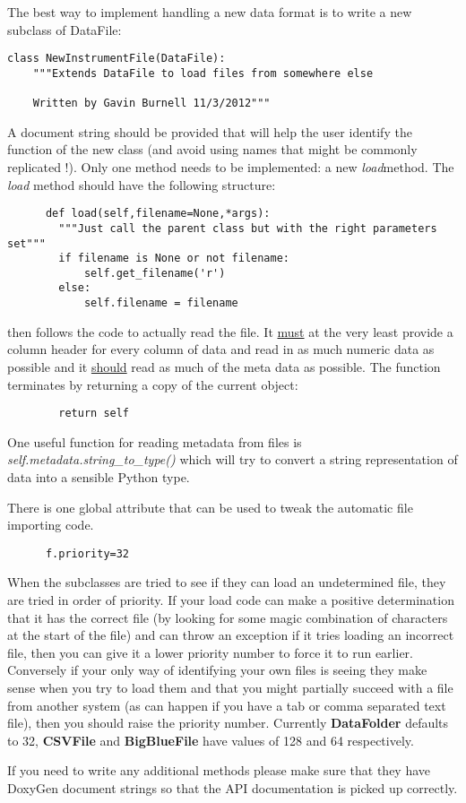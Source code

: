 \documentclass[a4paper,11pt]{scrartcl}
\begin{document}
The best way to implement handling a new data format is to write a new subclass of DataFile:
 \begin{verbatim}
class NewInstrumentFile(DataFile):
    """Extends DataFile to load files from somewhere else

    Written by Gavin Burnell 11/3/2012"""
 \end{verbatim}
 A document string should be provided that will help the user identify the function of the new class (and avoid using names that might be commonly replicated !). Only one method needs to be implemented: a new \textit{load}method. The \textit{load} method should have the following structure:
\begin{verbatim}
      def load(self,filename=None,*args):
        """Just call the parent class but with the right parameters set"""
        if filename is None or not filename:
            self.get_filename('r')
        else:
            self.filename = filename
\end{verbatim}
then follows the code to actually read the file. It \underline{must} at the very least provide a column header for every column of data and read in as much numeric data as possible and it \underline{should} read as much of the meta data as possible. The function terminates by returning a copy of the current object:
\begin{verbatim}
        return self
\end{verbatim}
One useful function for reading metadata from files is \textit{self.metadata.string\_to\_type()} which will try to convert a string representation of data into a sensible Python type.

There is one global attribute that can be used to tweak the automatic file importing code.
\begin{verbatim}
      f.priority=32
\end{verbatim}

When the subclasses are tried to see if they can load an undetermined file, they are tried in order of priority. If your load code can make a positive determination that it has the correct file (\eg by looking for some magic combination of characters at the start of the file) and can throw an exception if it tries loading an incorrect file, then you can give it a lower priority number to force it to run earlier. Conversely if your only way of identifying your own files is seeing they make sense when you try to load them and that you might partially succeed with a file from another system (as can happen if you have a tab or comma separated text file), then you should raise the priority number. Currently \textbf{DataFolder} defaults to 32, \textbf{CSVFile} and \textbf{BigBlueFile} have values of 128 and 64 respectively.

If you need to write any additional methods please make sure that they have DoxyGen document strings so that the API documentation is picked up correctly.
\end{document}
